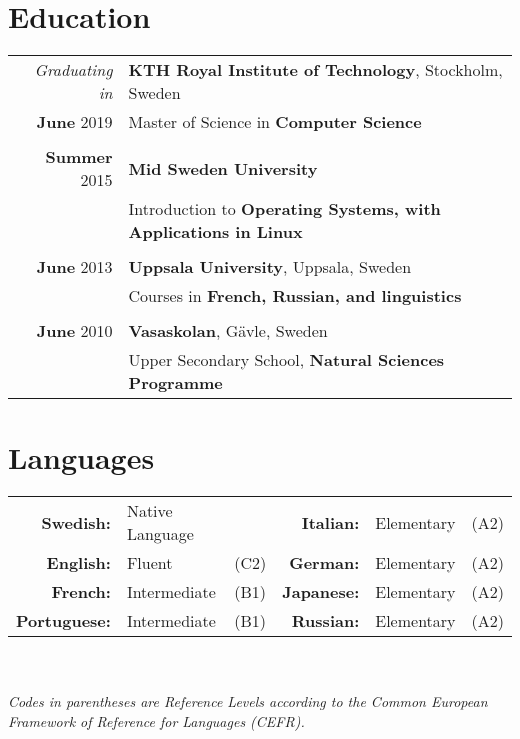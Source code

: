 \documentclass[a4paper,10pt]{article}
\begin{document}
\section{Education}
\begin{tabular}{r|l}
\emph{Graduating in} & \textbf{KTH Royal Institute of Technology}, Stockholm, Sweden\\	
 \textbf{June} 2019 & Master of Science in \textbf{Computer Science}\\&\\
\textbf{Summer} 2015& \textbf{Mid Sweden University}\\& Introduction to \textbf{Operating Systems, with Applications in Linux}\\&\\
\textbf{June} 2013& \textbf{Uppsala University}, Uppsala, Sweden\\& Courses in \textbf{French, Russian, and linguistics}\\&\\
\textbf{June} 2010& \textbf{Vasaskolan}, Gävle, Sweden \\& Upper Secondary School, \textbf{Natural Sciences Programme}
\end{tabular}

\section{Languages}
\begin{tabular}{rll|rll}
\textbf{Swedish:}&Native Language&&
\textbf{Italian:}&Elementary&(A2)\\
\textbf{English:}&Fluent&(C2)&
\textbf{German:}&Elementary&(A2)\\
\textbf{French:}&Intermediate&(B1)&
\textbf{Japanese:}&Elementary&(A2)\\
\textbf{Portuguese:}&Intermediate&(B1)&
\textbf{Russian:}&Elementary&(A2)
\end{tabular}
\\ \\
\textit{Codes in parentheses are Reference Levels according to the Common European Framework of Reference for Languages (CEFR).}
\end{document}
